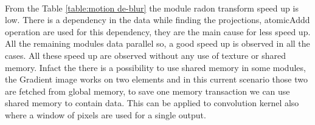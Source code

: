 \paragraph*{}From the Table \ref{table:motion de-blur} the module radon transform speed up is low. There is a dependency in the data while finding the projections, atomicAddd operation are used for this dependency, they are the main cause for less speed up. All the remaining modules data parallel so, a good speed up is observed in all the cases. All these speed up are observed without any use of texture or shared memory. Infact the there is a possibility to use shared memory in some modules, the Gradient image works on two elements and in this current scenario those two are fetched from global memory, to save one memory transaction we can use shared memory to contain data. This can be applied to convolution kernel also where a window of pixels are used for a single output.


%
